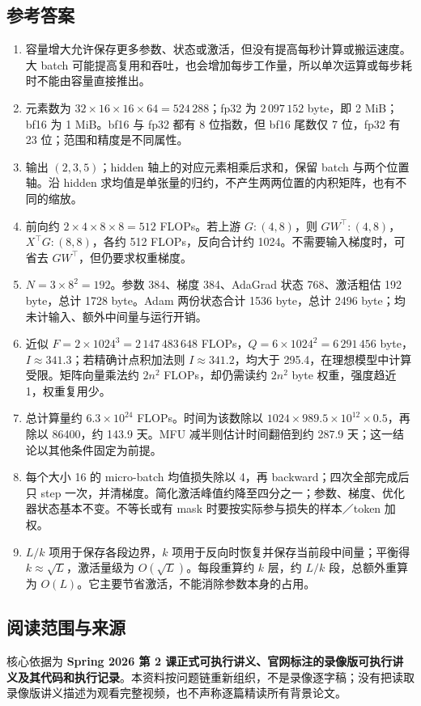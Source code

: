 \documentclass[UTF8,fontset=fandol,zihao=-4,a4paper]{ctexart}
\newcommand{\nextpage}{\clearpage}
\begin{document}
\subsection{参考答案}
\begin{enumerate}[label=\textbf{A\arabic*.},itemsep=0.45em]
\item 容量增大允许保存更多参数、状态或激活，但没有提高每秒计算或搬运速度。大 batch 可能提高复用和吞吐，也会增加每步工作量，所以单次运算或每步耗时不能由容量直接推出。
\item 元素数为 $32\times16\times16\times64=524\,288$；fp32 为 $2\,097\,152$ byte，即 2 MiB；bf16 为 1 MiB。bf16 与 fp32 都有 8 位指数，但 bf16 尾数仅 7 位，fp32 有 23 位；范围和精度是不同属性。
\item 输出 $(2,3,5)$；hidden 轴上的对应元素相乘后求和，保留 batch 与两个位置轴。沿 hidden 求均值是单张量的归约，不产生两两位置的内积矩阵，也有不同的缩放。
\item 前向约 $2\times4\times8\times8=512$ FLOPs。若上游 $G:(4,8)$，则 $GW^\top:(4,8)$，$X^\top G:(8,8)$，各约 512 FLOPs，反向合计约 1024。不需要输入梯度时，可省去 $GW^\top$，但仍要求权重梯度。
\item $N=3\times8^2=192$。参数 384、梯度 384、AdaGrad 状态 768、激活粗估 192 byte，总计 1728 byte。Adam 两份状态合计 1536 byte，总计 2496 byte；均未计输入、额外中间量与运行开销。
\item 近似 $F=2\times1024^3=2\,147\,483\,648$ FLOPs，$Q=6\times1024^2=6\,291\,456$ byte，$I\approx341.3$；若精确计点积加法则 $I\approx341.2$，均大于 295.4，在理想模型中计算受限。矩阵向量乘法约 $2n^2$ FLOPs，却仍需读约 $2n^2$ byte 权重，强度趋近 1，权重复用少。
\item 总计算量约 $6.3\times10^{24}$ FLOPs。时间为该数除以 $1024\times989.5\times10^{12}\times0.5$，再除以 86400，约 143.9 天。MFU 减半则估计时间翻倍到约 287.9 天；这一结论以其他条件固定为前提。
\item 每个大小 16 的 micro-batch 均值损失除以 4，再 backward；四次全部完成后只 step 一次，并清梯度。简化激活峰值约降至四分之一；参数、梯度、优化器状态基本不变。不等长或有 mask 时要按实际参与损失的样本／token 加权。
\item $L/k$ 项用于保存各段边界，$k$ 项用于反向时恢复并保存当前段中间量；平衡得 $k\approx\sqrt L$，激活量级为 $O(\sqrt L)$。每段重算约 $k$ 层，约 $L/k$ 段，总额外重算为 $O(L)$。它主要节省激活，不能消除参数本身的占用。
\end{enumerate}

\nextpage
\subsection{阅读范围与来源}\label{sec:sources}
\small
核心依据为 \textbf{Spring 2026 第 2 课正式可执行讲义、官网标注的录像版可执行讲义及其代码和执行记录}。本资料按问题链重新组织，不是录像逐字稿；没有把读取录像版讲义描述为观看完整视频，也不声称逐篇精读所有背景论文。
\end{document}
